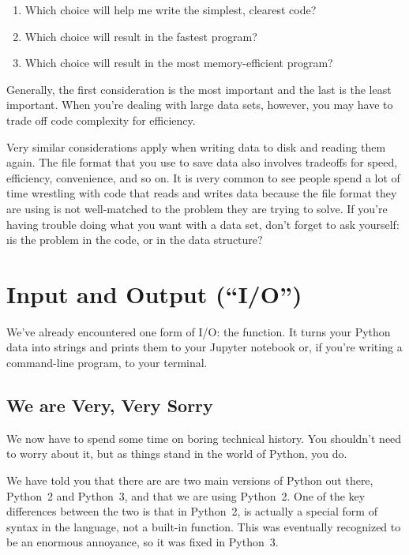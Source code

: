 \documentclass[letterpaper, 12pt, titlepage, twoside]{article}
\begin{document}
\begin{enumerate}
\item Which choice will help me write the simplest, clearest code?
\item Which choice will result in the fastest program?
\item Which choice will result in the most memory-efficient program?
\end{enumerate}

Generally, the first consideration is the most important and the last is the
least important. When you're dealing with large data sets, however, you may
have to trade off code complexity for efficiency.

Very similar considerations apply when writing data to disk and reading them
again. The file format that you use to save data also involves tradeoffs for
speed, efficiency, convenience, and so on. It is \i{very common} to see people
spend a lot of time wrestling with code that reads and writes data because the
file format they are using is not well-matched to the problem they are trying
to solve. If you're having trouble doing what you want with a data set, don't
forget to ask yourself: \i{is the problem in the code, or in the data
  structure}?


\newpage
\section{Input and Output (``I/O'')}

We've already encountered one form of I/O: the  function. It turns
your Python data into strings and prints them to your Jupyter notebook or, if
you're writing a command-line program, to your terminal.

\subsection*{We are Very, Very Sorry}

We now have to spend some time on boring technical history. You shouldn't need
to worry about it, but as things stand in the world of Python, you do.

We have told you that there are are two main versions of Python out there,
Python~2 and Python~3, and that we are using Python~2. One of the key
differences between the two is that in Python~2,  is actually a
special form of syntax in the language, not a built-in function. This was
eventually recognized to be an enormous annoyance, so it was fixed in
Python~3.
\end{document}

